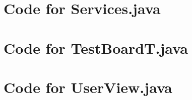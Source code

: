 \documentclass[12pt]{article}
\begin{document}
\newpage

\section{Code for Services.java}

\noindent 

\newpage

\section{Code for TestBoardT.java}

\noindent 

\newpage

\section{Code for UserView.java}

\noindent 

\newpage
\end{document}
